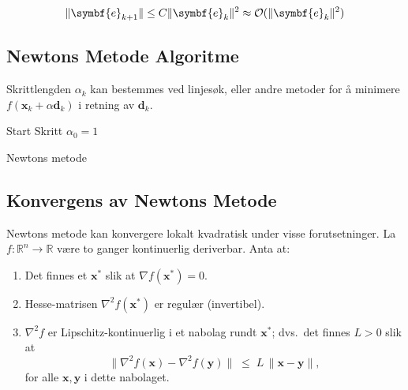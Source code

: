 \[
	\norm{\symbf{e}_{k+1}} \leq C \norm{\symbf{e}_k}^2 \approx \mathcal{O}(\norm{\symbf{e}_k}^2)
\]

\subsection{Newtons Metode Algoritme}
Skrittlengden \(\alpha_k\) kan bestemmes ved linjesøk, eller andre metoder for å minimere \(f(\symbf{x}_k + \alpha \symbf{d}_k)\) i retning av \(\symbf{d}_k\).

\begin{algorithm}[H]
	\SetAlgoLined
	Start Skritt \(\alpha_0 = 1\)\;
	\caption{Newtons metode}
\end{algorithm}

\subsection{Konvergens av Newtons Metode}
Newtons metode kan konvergere lokalt kvadratisk under visse forutsetninger.
La \( f : \mathbb{R}^n \to \mathbb{R} \) være to ganger kontinuerlig deriverbar. Anta at:

\begin{enumerate}
	\item Det finnes et \(\symbf{x}^\ast\) slik at \(\nabla f(\symbf{x}^\ast) = 0\).
	\item Hesse-matrisen \(\nabla^2 f(\symbf{x}^\ast)\) er regulær (invertibel).
	\item \(\nabla^2 f\) er Lipschitz-kontinuerlig i et nabolag rundt \(\symbf{x}^\ast\); dvs.\ det finnes \( L > 0 \) slik at
	      \[
		      \| \nabla^2 f(\symbf{x}) - \nabla^2 f(\symbf{y}) \|
		      \;\le\;
		      L\,\|\symbf{x} - \symbf{y}\|,
	      \]
	      for alle \(\symbf{x}, \symbf{y}\) i dette nabolaget.
\end{enumerate}

